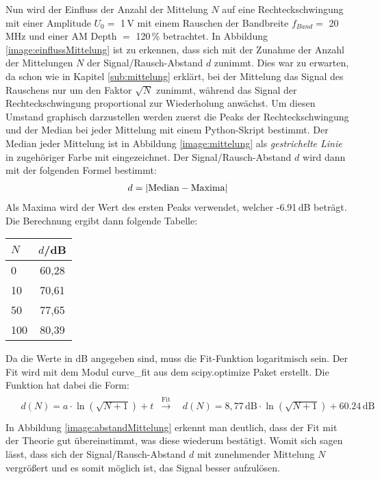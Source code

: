Nun wird der Einfluss der Anzahl der Mittelung $N$ auf eine Rechteckschwingung mit einer Amplitude $U_0=$ 1\,V mit einem Rauschen der Bandbreite $f_{Band}=$ 20\,MHz und einer AM Depth $=$ 120\,\% betrachtet.
In Abbildung \ref{image:einflussMittelung} ist zu erkennen, dass sich mit der Zunahme der Anzahl der Mittelungen $N$ der Signal/Rausch-Abstand $d$ zunimmt. Dies war zu erwarten, da schon wie in Kapitel \ref{sub:mittelung} erklärt, bei der Mittelung das Signal des Rauschens nur um den Faktor $\sqrt{N}$ zunimmt, während das Signal der Rechteckschwingung proportional zur Wiederholung anwächst. Um diesen Umstand graphisch darzustellen werden zuerst die Peaks der Rechteckschwingung und der Median bei jeder Mittelung mit einem Python-Skript bestimmt. Der Median jeder Mittelung ist in Abbildung \ref{image:mittelung} als \textit{gestrichelte Linie} in zugehöriger Farbe mit eingezeichnet. Der Signal/Rausch-Abstand $d$ wird dann mit der folgenden Formel bestimmt:
\begin{gather}
    d = \abs{\text{Median} - \text{Maxima}}
\end{gather}
Als Maxima wird der Wert des ersten Peaks verwendet, welcher -6.91\,dB beträgt. Die Berechnung ergibt dann folgende Tabelle:
\begin{center}
    \begin{tabular}{l | c}
        $N$ & $d$/dB\\
        \hline
        0   & 60,28 \\
        10  & 70,61 \\
        50  & 77,65 \\
        100 & 80,39 \\
    \end{tabular}
\end{center}
Da die Werte in dB angegeben sind, muss die Fit-Funktion logaritmisch sein. Der Fit wird mit dem Modul curve\_fit aus dem scipy.optimize Paket erstellt. Die Funktion hat dabei die Form:
\begin{gather}
    \begin{aligned}
       &d(N) = a\cdot\ln(\sqrt{N+1}) + t &\xrightarrow{\text{Fit}} &~~d(N) = 8,77\,\text{dB}\cdot\ln(\sqrt{N+1}) + 60.24\,\text{dB} \\
    \end{aligned}
\end{gather}
In Abbildung \ref{image:abstandMittelung} erkennt man deutlich, dass der Fit mit der Theorie gut übereinstimmt, was diese wiederum bestätigt. Womit sich sagen lässt, dass sich der Signal/Rausch-Abstand $d$ mit zunehmender Mittelung $N$ vergrößert und es somit möglich ist, das Signal besser aufzulösen.
